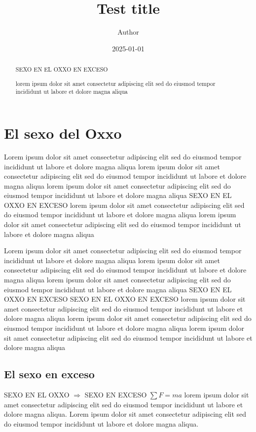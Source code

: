 \documentclass{article}
\title{Test title}
\author{Author}
\date{2025-01-01}
\begin{document}
\maketitle
\newpage

\begin{abstract}
	SEXO EN EL OXXO EN EXCESO

	lorem ipsum dolor sit amet consectetur adipiscing elit sed do eiusmod tempor incididunt ut labore et dolore magna aliqua
\end{abstract}
\newpage

\section{El sexo del Oxxo}
	Lorem ipsum dolor sit amet consectetur adipiscing elit sed do eiusmod tempor incididunt ut labore et dolore magna aliqua
	lorem ipsum dolor sit amet consectetur adipiscing elit sed do eiusmod tempor incididunt ut labore et dolore magna aliqua
	lorem ipsum dolor sit amet consectetur adipiscing elit sed do eiusmod tempor incididunt ut labore et dolore magna aliqua
	SEXO EN EL OXXO EN EXCESO
	lorem ipsum dolor sit amet consectetur adipiscing elit sed do eiusmod tempor incididunt ut labore et dolore magna aliqua
	lorem ipsum dolor sit amet consectetur adipiscing elit sed do eiusmod tempor incididunt ut labore et dolore magna aliqua

	Lorem ipsum dolor sit amet consectetur adipiscing elit sed do eiusmod tempor incididunt ut labore et dolore magna aliqua
	lorem ipsum dolor sit amet consectetur adipiscing elit sed do eiusmod tempor incididunt ut labore et dolore magna aliqua
	lorem ipsum dolor sit amet consectetur adipiscing elit sed do eiusmod tempor incididunt ut labore et dolore magna aliqua
	SEXO EN EL OXXO EN EXCESO
	SEXO EN EL OXXO EN EXCESO
	lorem ipsum dolor sit amet consectetur adipiscing elit sed do eiusmod tempor incididunt ut labore et dolore magna aliqua
	lorem ipsum dolor sit amet consectetur adipiscing elit sed do eiusmod tempor incididunt ut labore et dolore magna aliqua
	lorem ipsum dolor sit amet consectetur adipiscing elit sed do eiusmod tempor incididunt ut labore et dolore magna aliqua

	\subsection{El sexo en exceso}	
		SEXO EN EL OXXO $\Rightarrow$ SEXO EN EXCESO $\sum F = ma$
		lorem ipsum dolor sit amet consectetur adipiscing elit sed do eiusmod tempor incididunt ut labore et dolore magna aliqua. 
		Lorem ipsum dolor sit amet consectetur adipiscing elit sed do eiusmod tempor incididunt ut labore et dolore magna aliqua. 
\end{document}
